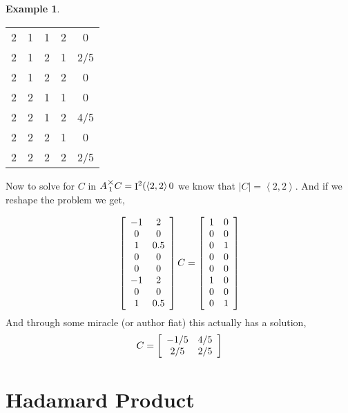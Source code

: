 \documentclass[12pt]{book}
\theoremstyle{plain}
\theoremstyle{definition}
\newtheorem{example}{Example}[chapter]
\theoremstyle{ppart}
\theoremstyle{case}
\theoremstyle{solution}
\DeclareMathOperator{\Ident}{I}
\newcommand{\mmult}[1]{\text{\raisebox{1ex}{$\underset{#1}{\times}$}}}
\newcommand{\shape}[1]{\left|#1\right|}
\begin{document}
\begin{example}
\begin{table}[h!]
\begin{center}
\begin{tabular}{c c c c | c}
2           & 1           & 1           & 2           & 0 \\
2           & 1           & 2           & 1           & 2/5 \\
2           & 1           & 2           & 2           & 0 \\
2           & 2           & 1           & 1           & 0 \\
2           & 2           & 1           & 2           & 4/5 \\
2           & 2           & 2           & 1           & 0 \\
2           & 2           & 2           & 2           & 2/5 
\end{tabular}
\end{center}
\end{table}

Now to solve for $C$ in $A \mmult{1} C = \Ident^2(\left<2,2\right>0$ we know
that $\shape{C} = \left<2,2\right>$.
And if we reshape the problem we get,

\[
\left[
  \begin{array}{c c}
    -1 & 2 \\
    0 & 0 \\
    1 & 0.5 \\
    0 & 0 \\
    0 & 0 \\
    -1 & 2 \\
    0 & 0 \\
    1 & 0.5
  \end{array}
\right]
C
=
\left[
  \begin{array}{c c}
    1 & 0 \\
    0 & 0 \\
    0 & 1 \\
    0 & 0 \\
    0 & 0 \\
    1 & 0 \\
    0 & 0 \\
    0 & 1
  \end{array}
\right]
\]
And through some miracle (or author fiat) this actually has a solution,
\[
  C =
  \left[
    \begin{array}{c c}
      -1/5 & 4/5 \\
      2/5 & 2/5
    \end{array}
  \right]
\]
\end{example}

\section{Hadamard Product}
\end{document}
